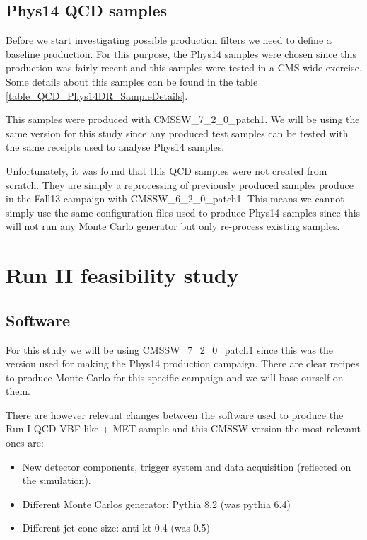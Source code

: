 \documentclass[a4paper]{article}
\begin{document}
\subsection{Phys14 QCD samples}

Before we start investigating possible production filters we need to define a baseline production. For this purpose, the Phys14 samples were chosen since this production was fairly recent and this samples were tested in a CMS wide exercise. Some details about this samples can be found in the table \ref{table_QCD_Phys14DR_SampleDetails}.



This samples were produced with CMSSW\_7\_2\_0\_patch1. We will be using the same version for this study since any produced test samples can be tested with the same receipts used to analyse Phys14 samples.

Unfortunately, it was found that this QCD samples were not created from scratch. They are simply a reprocessing of previously produced samples produce in the Fall13 campaign with CMSSW\_6\_2\_0\_patch1. This means we cannot simply use the same configuration files used to produce Phys14 samples since this will not run any Monte Carlo generator but only re-process existing samples.  


\section{Run II feasibility study}

\subsection{Software}

For this study we will be using CMSSW\_7\_2\_0\_patch1 since this was the version used for making the Phys14 production campaign. There are clear recipes to produce Monte Carlo for this specific campaign and we will base ourself on them.

There are however relevant changes between the software used to produce the Run I QCD VBF-like + MET sample and this CMSSW version the most relevant ones are:
\begin{itemize}
  \item New detector components, trigger system and data acquisition (reflected on the simulation).
  \item Different Monte Carlos generator: Pythia 8.2 (was pythia 6.4) %
  \item Different jet cone size: anti-kt 0.4 (was 0.5)
\end{itemize}
\end{document}
